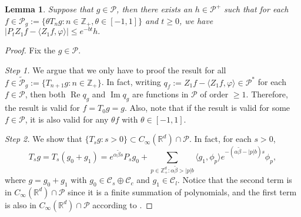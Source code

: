 \documentclass[12pt,a4paper]{amsart}
\theoremstyle{plain}
\newtheorem{lem}[thm]{Lemma}
\theoremstyle{definition}
\numberwithin{equation}{section}
\begin{document}
\begin{lem}
\label{lem:P:R}
Suppose that $g \in \mathcal P$, then there exists an $h \in \mathcal P^+$ such that for each 
\(
f 
\in \mathcal P_g
:= \{\theta T_n g: n \in \mathbb Z_+, \theta \in [-1,1]\}
\) 
and $t\geq 0$, we have
\(
\big | P_t Z_1 f - \langle Z_1 f, \varphi \rangle \big|
\leq e^{-bt} h.
\)
\end{lem}
\begin{proof}
  Fix the $g \in \mathcal P$.
  
  \emph{Step 1.} We argue that we only have to proof the result for all $f \in \widetilde{\mathcal P}_g:= \{T_{n+1} g : n \in \mathbb Z_+\}$.
  In fact, writing $q_f:=Z_1f - \langle Z_1f, \varphi \rangle \in \mathcal P^*$ for each $f\in \mathcal P$, then both $\operatorname{Re} q_g$ and $\operatorname{Im} q_g$ are functions in $\mathcal P$ of order $\geq 1$.
Therefore, the result is valid for $f = T_0 g = g$. 
Also, note that if the result is valid for some $f \in \mathcal P$, it is also valid for any $\theta f$ with $\theta \in [-1,1]$.
  
\emph{Step 2.} We show that $\{T_s g: s> 0\} \subset C_\infty (\mathbb R^d) \cap \mathcal P$. 
In fact, for each $s > 0$,
\[ 
  T_s g 
  = T_s (g_0 + g_1) 
  = e^{\alpha \tilde \beta s}P_s g_0 + \sum_{p \in \mathbb Z_+^d: \alpha \tilde \beta > |p|b} \langle g_1, \phi_p \rangle e^{-(\alpha \tilde \beta - |p|b)s} \phi_p,
\]
where $g = g_0 +g_1$ with $g_0 \in \mathcal C_s \oplus \mathcal C_c$ and $g_1 \in \mathcal C_l$. 
Notice that the second term is in $C_\infty(\mathbb R^d)\cap \mathcal P$ since it is a finite summation of polynomials, and the first term is also in $C_\infty (\mathbb R^d) \cap \mathcal P$ according to \cite[Fact 1.1]{MarksMilos2018CLT}.  


\end{proof}
\end{document}
